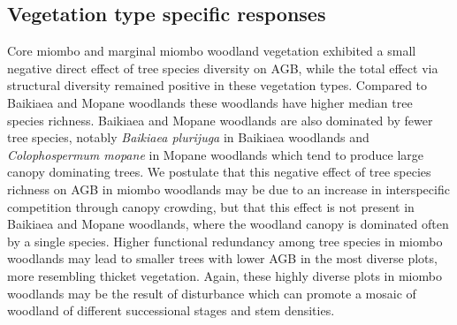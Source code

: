 \documentclass[11pt,a4paper]{article}
\begin{document}
\subsection{Vegetation type specific responses}


Core miombo and marginal miombo woodland vegetation exhibited a small negative direct effect of tree species diversity on AGB, while the total effect via structural diversity remained positive in these vegetation types. Compared to Baikiaea and Mopane woodlands these woodlands have higher median tree species richness. Baikiaea and Mopane woodlands are also dominated by fewer tree species, notably \textit{Baikiaea plurijuga} in Baikiaea woodlands and \textit{Colophospermum mopane} in Mopane woodlands which tend to produce large canopy dominating trees. We postulate that this negative effect of tree species richness on AGB in miombo woodlands may be due to an increase in interspecific competition through canopy crowding, but that this effect is not present in Baikiaea and Mopane woodlands, where the woodland canopy is dominated often by a single species. Higher functional redundancy among tree species in miombo woodlands may lead to smaller trees with lower AGB in the most diverse plots, more resembling thicket vegetation. Again, these highly diverse plots in miombo woodlands may be the result of disturbance which can promote a mosaic of woodland of different successional stages and stem densities.
\end{document}
